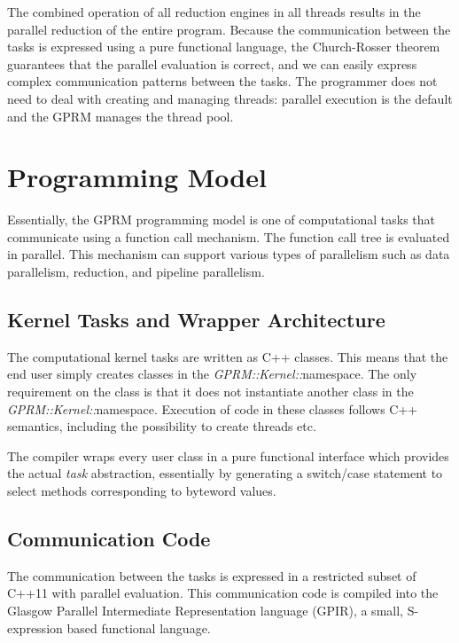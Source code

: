 \documentclass[copyright,creativecommons]{eptcs}
\newenvironment{lyxcode}
{\par\begin{list}{}{
\setlength{\rightmargin}{\leftmargin}
\setlength{\listparindent}{0pt}\raggedright
\setlength{\itemsep}{0pt}
\setlength{\parsep}{0pt}
\normalfont\ttfamily}\item[]}
{\end{list}}
\begin{document}
\begin{lyxcode}

\end{lyxcode}
The combined operation of all reduction engines in all threads results
in the parallel reduction of the entire program. Because the communication
between the tasks is expressed using a pure functional language, the
Church-Rosser theorem \cite{church1936some} guarantees that the parallel
evaluation is correct, and we can easily express complex communication
patterns between the tasks. The programmer does not need to deal with
creating and managing threads: parallel execution is the default and
the GPRM manages the thread pool. 


\section{Programming Model}

Essentially, the GPRM programming model is one of computational tasks
that communicate using a function call mechanism. The function call
tree is evaluated in parallel. This mechanism can support various
types of parallelism such as data parallelism, reduction, and pipeline
parallelism.


\subsection{Kernel Tasks and Wrapper Architecture}

The computational kernel tasks are written as C++ classes. This means
that the end user simply creates classes in the \emph{GPRM::Kernel::}namespace.
The only requirement on the class is that it does not instantiate
another class in the \emph{GPRM::Kernel::}namespace. Execution of
code in these classes follows C++ semantics, including the possibility
to create threads etc.

The compiler wraps every user class in a pure functional interface
which provides the actual \emph{task} abstraction, essentially by
generating a switch/case statement to select methods corresponding
to byteword values. 


\subsection{Communication Code}

The communication between the tasks is expressed in a restricted subset
of C++11 with parallel evaluation. This communication code is compiled
into the Glasgow Parallel Intermediate Representation language (GPIR),
a small, S-expression based functional language.
\end{document}
